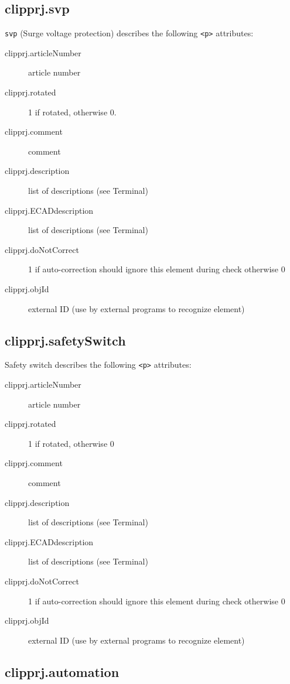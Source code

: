 \documentclass[%
	a4paper,
	oneside,
	listof=numbered,
	parskip=half,
	headsepline=true,
	footsepline=true,
	]{scrbook}
\begin{document}
\subsection{clipprj.svp}
 
\verb|svp| (Surge voltage protection) describes the following \verb|<p>| attributes: 

\begin{description}
	\item[clipprj.articleNumber] article number 
	\item[clipprj.rotated] 1 if rotated, otherwise 0. 
	\item[clipprj.comment] comment 
	\item[clipprj.description] list of descriptions (see Terminal) 
	\item[clipprj.ECADdescription] list of descriptions (see Terminal) 
	\item[clipprj.doNotCorrect] 1 if auto-correction should ignore this element during check otherwise 0
	\item[clipprj.objId] external ID (use by external programs to recognize element)
\end{description}

\subsection{clipprj.safetySwitch}
 
Safety switch describes the following \verb|<p>| attributes: 

\begin{description}
	\item[clipprj.articleNumber] article number
	\item[ clipprj.rotated] 1 if rotated, otherwise 0
	\item[clipprj.comment] comment
	\item[clipprj.description] list of descriptions (see Terminal)
	\item[clipprj.ECADdescription] list of descriptions (see Terminal)
	\item[clipprj.doNotCorrect] 1 if auto-correction should ignore this element during check otherwise 0
	\item[clipprj.objId] external ID (use by external programs to recognize element)
\end{description}

\subsection{clipprj.automation}
 
\end{document}
